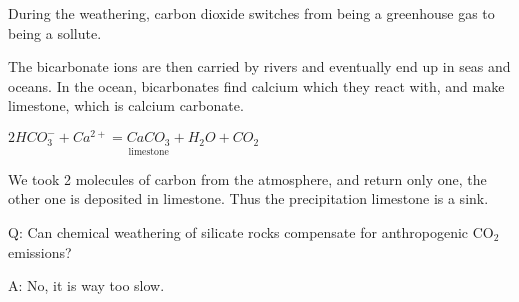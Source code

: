 During the weathering, carbon dioxide switches from being a greenhouse gas
to being a sollute.

The bicarbonate ions are then carried by rivers and eventually end up in seas
and oceans. In the ocean, bicarbonates find calcium which they react with, and
make limestone, which is calcium carbonate.

$
2 HCO_3^- + Ca^{2+} = \underset{\text{limestone}}{CaCO_3} + H_2O + CO_2
$

We took 2 molecules of carbon from the atmosphere, and return only one, the
other one is deposited in limestone.
Thus the precipitation limestone is a sink.

Q: Can chemical weathering of silicate rocks compensate for anthropogenic
CO$_2$ emissions?

A: No, it is way too slow.
